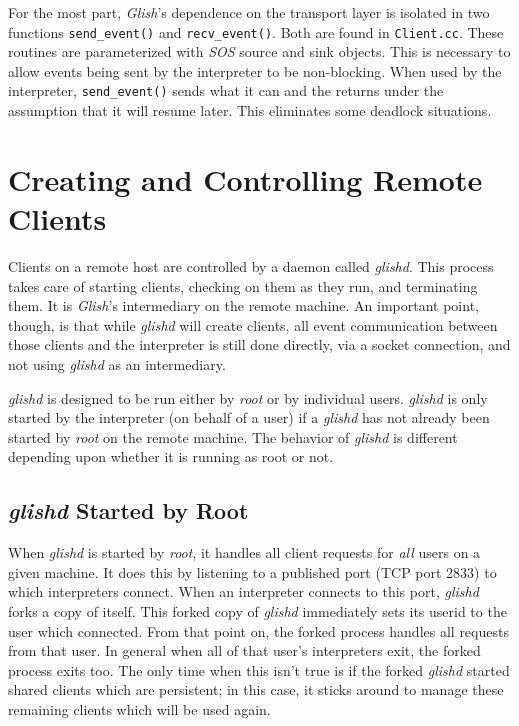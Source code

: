 \begin{sloppy}
For the most part, {\em Glish}'s dependence on the transport layer is isolated in two
functions \verb+send_event()+ and \verb+recv_event()+. Both are found
in \verb+Client.cc+. These routines are parameterized with {\em SOS} source and
sink objects. This is necessary to allow events being sent by the interpreter
to be non-blocking. When used by the interpreter, \verb+send_event()+ sends what
it can and the returns under the assumption that it will resume later. This
eliminates some deadlock situations.

\section{Creating and Controlling Remote Clients}
\label{glishd}

Clients on a remote host are controlled by a daemon called {\em glishd}.
This process takes care of starting clients, checking on them as they
run, and terminating them. It is {\em Glish}'s intermediary on the remote
machine. An important point, though, is that while {\em glishd}
will create clients, all event communication between those clients and the
interpreter is still done directly, via a socket connection, and not using
{\em glishd} as an intermediary.

{\em glishd} is designed to be run either by {\em root} or by individual
users. {\em glishd} is only started by the interpreter (on behalf of a user)
if a {\em glishd} has not already been started by {\em root} on the remote
machine. The behavior of {\em glishd} is different depending upon whether it
is running as root or not.

\subsection{{\em glishd} Started by Root}
\label{glishd-as-root}

When {\em glishd} is started by {\em root}, it handles all client
requests for {\em all} users on a given machine. It does this by listening
to a published port (TCP port 2833) to which interpreters connect.
When an interpreter connects to this port, {\em glishd} forks a copy of
itself. This forked copy of {\em glishd} immediately sets its userid to the
user which connected. From that point on, the forked process handles all
requests from that user. In general when all of that user's interpreters 
exit, the forked process exits too. The only time when this isn't true is if
the forked {\em glishd} started shared clients which are persistent; in this
case, it sticks around to manage these remaining clients which will be used
again.


\end{sloppy}
